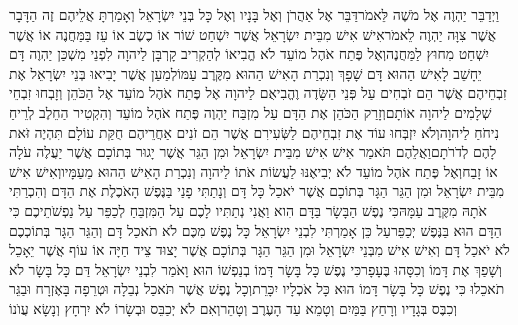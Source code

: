 \documentclass[../main/main.tex]{subfiles}
\begin{document}
\begin{multicols*}{\ncols}
וַיְדַבֵּר יַהְוֶה אֶל מֹשֶׁה לֵּאמֹר\PreVerseSpace{}דַּבֵּר אֶל אַהֲרֹן וְאֶל בָּנָיו וְאֶל כָּל בְּנֵי יִשְׂרָאֵל וְאָמַרְתָּ אֲלֵיהֶם זֶה הַדָּבָר אֲשֶׁר צִוָּה יַהְוֶה לֵאמֹר\PreVerseSpace{}אִישׁ אִישׁ מִבֵּית יִשְׂרָאֵל אֲשֶׁר יִשְׁחַט שׁוֹר אוֹ כֶשֶׂב אוֹ עֵז בַּמַּחֲנֶה אוֹ אֲשֶׁר יִשְׁחַט מִחוּץ לַמַּחֲנֶה\PreVerseSpace{}וְאֶל פֶּתַח אֹהֶל מוֹעֵד לֹא הֱבִיאוֹ לְהַקְרִיב קָרְבָּן לַיהוָה לִפְנֵי מִשְׁכַּן יַהְוֶה דָּם יֵחָשֵׁב לָאִישׁ הַהוּא דָּם שָׁפָךְ וְנִכְרַת הָאִישׁ הַהוּא מִקֶּרֶב עַמּוֹ\PreVerseSpace{}לְמַעַן אֲשֶׁר יָבִיאוּ בְּנֵי יִשְׂרָאֵל אֶת זִבְחֵיהֶם אֲשֶׁר הֵם זֹבְחִים עַל פְּנֵי הַשָּׂדֶה וֶהֱבִיאֻם לַיהוָה אֶל פֶּתַח אֹהֶל מוֹעֵד אֶל הַכֹּהֵן וְזָבְחוּ זִבְחֵי שְׁלָמִים לַיהוָה אוֹתָם\PreVerseSpace{}וְזָרַק הַכֹּהֵן אֶת הַדָּם עַל מִזְבַּח יַהְוֶה פֶּתַח אֹהֶל מוֹעֵד וְהִקְטִיר הַחֵלֶב לְרֵיחַ נִיחֹחַ לַיהוָה\PreVerseSpace{}וְלֹא יִזְבְּחוּ עוֹד אֶת זִבְחֵיהֶם לַשְּׂעִירִם אֲשֶׁר הֵם זֹנִים אַחֲרֵיהֶם חֻקַּת עוֹלָם תִּהְיֶה זֹּאת לָהֶם לְדֹרֹתָם\PreVerseSpace{}וַאֲלֵהֶם תֹּאמַר אִישׁ אִישׁ מִבֵּית יִשְׂרָאֵל וּמִן הַגֵּר אֲשֶׁר יָגוּר בְּתוֹכָם אֲשֶׁר יַעֲלֶה עֹלָה אוֹ זָבַח\PreVerseSpace{}וְאֶל פֶּתַח אֹהֶל מוֹעֵד לֹא יְבִיאֶנּוּ לַעֲשׂוֹת אֹתוֹ לַיהוָה וְנִכְרַת הָאִישׁ הַהוּא מֵעַמָּיו\PreVerseSpace{}וְאִישׁ אִישׁ מִבֵּית יִשְׂרָאֵל וּמִן הַגֵּר הַגָּר בְּתוֹכָם אֲשֶׁר יֹאכַל כָּל דָּם וְנָתַתִּי פָנַי בַּנֶּפֶשׁ הָאֹכֶלֶת אֶת הַדָּם וְהִכְרַתִּי אֹתָהּ מִקֶּרֶב עַמָּהּ\PreVerseSpace{}כִּי נֶפֶשׁ הַבָּשָׂר בַּדָּם הִוא וַאֲנִי נְתַתִּיו לָכֶם עַל הַמִּזְבֵּחַ לְכַפֵּר עַל נַפְשֹׁתֵיכֶם כִּי הַדָּם הוּא בַּנֶּפֶשׁ יְכַפֵּר\PreVerseSpace{}עַל כֵּן אָמַרְתִּי לִבְנֵי יִשְׂרָאֵל כָּל נֶפֶשׁ מִכֶּם לֹא תֹאכַל דָּם וְהַגֵּר הַגָּר בְּתוֹכְכֶם לֹא יֹאכַל דָּם \ClosedSection{}וְאִישׁ אִישׁ מִבְּנֵי יִשְׂרָאֵל וּמִן הַגֵּר הַגָּר בְּתוֹכָם אֲשֶׁר יָצוּד צֵיד חַיָּה אוֹ עוֹף אֲשֶׁר יֵאָכֵל וְשָׁפַךְ אֶת דָּמוֹ וְכִסָּהוּ בֶּעָפָר\PreVerseSpace{}כִּי נֶפֶשׁ כָּל בָּשָׂר דָּמוֹ בְנַפְשׁוֹ הוּא וָאֹמַר לִבְנֵי יִשְׂרָאֵל דַּם כָּל בָּשָׂר לֹא תֹאכֵלוּ כִּי נֶפֶשׁ כָּל בָּשָׂר דָּמוֹ הוּא כָּל אֹכְלָיו יִכָּרֵת\PreVerseSpace{}וְכָל נֶפֶשׁ אֲשֶׁר תֹּאכַל נְבֵלָה וּטְרֵפָה בָּאֶזְרָח וּבַגֵּר וְכִבֶּס בְּגָדָיו וְרָחַץ בַּמַּיִם וְטָמֵא עַד הָעֶרֶב וְטָהֵר\PreVerseSpace{}וְאִם לֹא יְכַבֵּס וּבְשָׂרוֹ לֹא יִרְחָץ וְנָשָׂא עֲוֺנוֹ\OpenSection{}\par

\end{multicols*}
\end{document}
